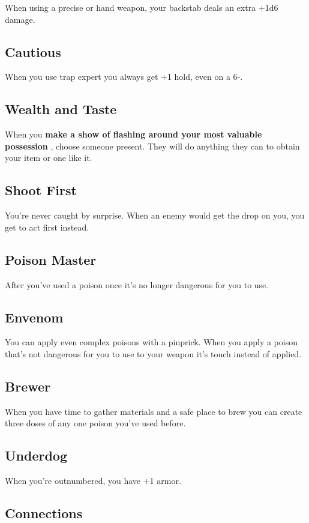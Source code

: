 When using a precise or hand weapon, your backstab deals an extra +1d6 damage.
\subsection{Cautious}

When you use trap expert you always get +1 hold, even on a 6-.
\subsection{Wealth and Taste}

When you \textbf{make a show of flashing around your most valuable possession}
, choose someone present. They will do anything they can to obtain your item or one like it.
\subsection{Shoot First}

You're never caught by surprise. When an enemy would get the drop on you, you get to act first instead.
\subsection{Poison Master}

After you've used a poison once it's no longer dangerous for you to use.
\subsection{Envenom}

You can apply even complex poisons with a pinprick. When you apply a poison that's not dangerous for you to use to your weapon it's touch instead of applied.
\subsection{Brewer}

When you have time to gather materials and a safe place to brew you can create three doses of any one poison you've used before.
\subsection{Underdog}

When you're outnumbered, you have +1 armor.
\subsection{Connections}

